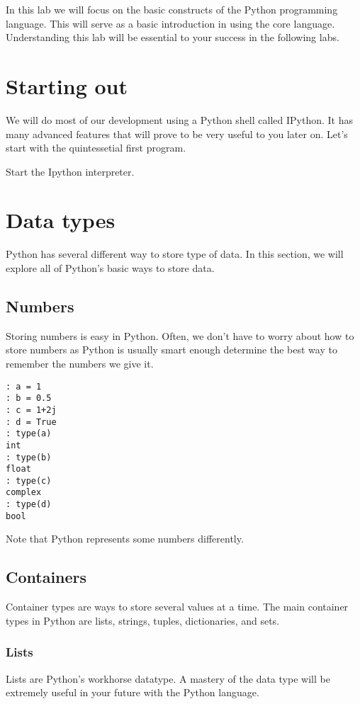 \label{Lab:Python}

In this lab we will focus on the basic constructs of the Python programming language.  This will serve as a basic introduction in using the core language.  Understanding this lab will be essential to your success in the following labs.

\section*{Starting out}
We will do most of our development using a Python shell called IPython.  It has many advanced features that will prove to be very useful to you later on.  Let's start with the quintessetial first program.

Start the Ipython interpreter.

\section*{Data types}
Python has several different way to store type of data.  In this section, we will explore all of Python's basic ways to store data.

\subsection*{Numbers}
Storing numbers is easy in Python.  Often, we don't have to worry about how to store numbers as Python is usually smart enough determine the best way to remember the numbers we give it.
\begin{lstlisting}[style=python]
: a = 1
: b = 0.5
: c = 1+2j
: d = True
: type(a)
int
: type(b)
float
: type(c)
complex
: type(d)
bool
\end{lstlisting}
Note that Python represents some numbers differently.

\subsection*{Containers}
Container types are ways to store several values at a time.  The main container types in Python are lists, strings, tuples, dictionaries, and sets.

\subsubsection*{Lists}
Lists are Python's workhorse datatype.  A mastery of the data type will be extremely useful in your future with the Python language.

